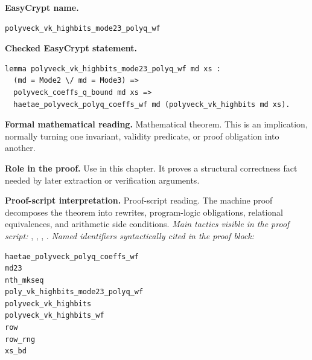 \begin{formaltheorem}
\noindent\textbf{EasyCrypt name.}
\begin{lstlisting}[language=EasyCrypt,basicstyle=\ttfamily\scriptsize]
polyveck_vk_highbits_mode23_polyq_wf
\end{lstlisting}
\noindent\textbf{Checked EasyCrypt statement.}
\begin{lstlisting}[language=EasyCrypt,basicstyle=\ttfamily\scriptsize]
lemma polyveck_vk_highbits_mode23_polyq_wf md xs :
  (md = Mode2 \/ md = Mode3) =>
  polyveck_coeffs_q_bound md xs =>
  haetae_polyveck_polyq_coeffs_wf md (polyveck_vk_highbits md xs).
\end{lstlisting}
\noindent\textbf{Formal mathematical reading.}
Mathematical theorem. This is an implication, normally turning one invariant, validity predicate, or proof obligation into another.

\noindent\textbf{Role in the proof.}
Use in this chapter. It proves a structural correctness fact needed by later extraction or verification arguments.

\noindent\textbf{Proof-script interpretation.}
Proof-script reading. The machine proof decomposes the theorem into rewrites, program-logic obligations, relational equivalences, and arithmetic side conditions.
\emph{Main tactics visible in the proof script:} , , , .
\emph{Named identifiers syntactically cited in the proof block:}
\begin{lstlisting}[language=EasyCrypt,basicstyle=\ttfamily\scriptsize]
haetae_polyveck_polyq_coeffs_wf
md23
nth_mkseq
poly_vk_highbits_mode23_polyq_wf
polyveck_vk_highbits
polyveck_vk_highbits_wf
row
row_rng
xs_bd
\end{lstlisting}

\end{formaltheorem}

